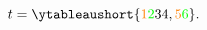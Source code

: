 \documentclass[crop,equation,convert={outext=.svg,command=\unexpanded{pdf2svg \infile\space\outfile}},multi=false]{standalone}
\begin{document}
\color{white}\Huge\boldmath
{} 
$t = \ytableaushort{{\color{orange}1}{\color{green}2}34,{\color{orange}5}{\color{green}6}}.$
\end{document}
